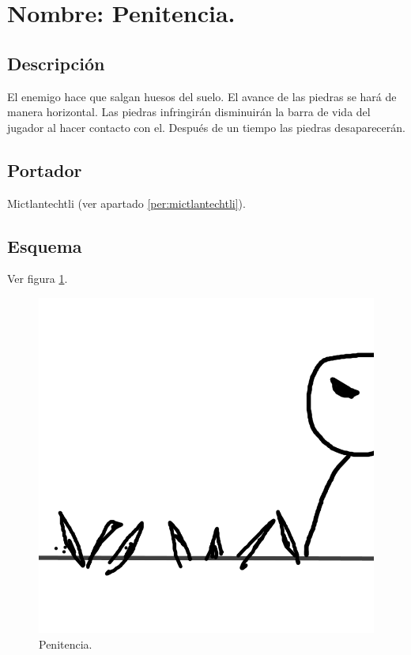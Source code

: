\section{Nombre: Penitencia.}\label{hab.Penitencia}
\subsection{Descripción}
El enemigo hace que salgan huesos del suelo. El avance de las piedras se hará de manera horizontal. Las piedras infringirán disminuirán la barra de vida del jugador al hacer contacto con el. Después de un tiempo las piedras desaparecerán.
\subsection{Portador}
Mictlantechtli (ver apartado \ref{per:mictlantechtli}).	
\subsection{Esquema}
			Ver figura \ref{fig:penitencia}.
			\begin{figure}
				\centering
				\includegraphics[height=0.2 \textheight]{Imagenes/penitencia}
				\caption{Penitencia.}
				\label{fig:penitencia}
			\end{figure}